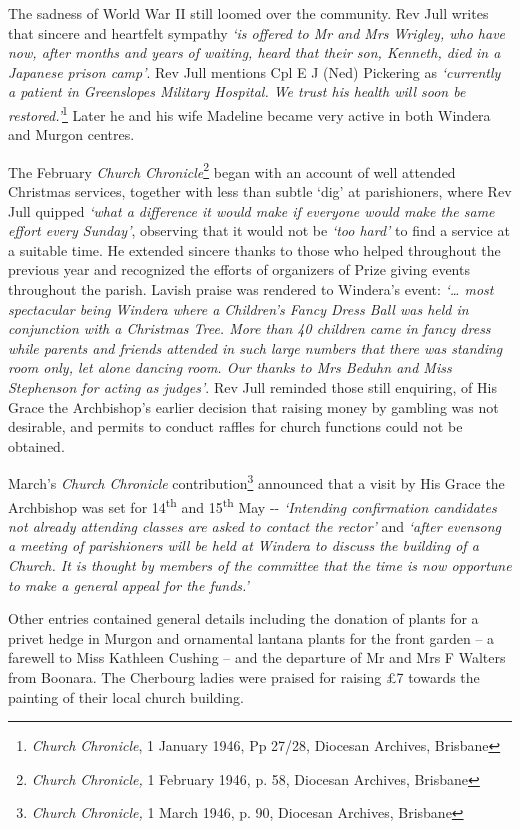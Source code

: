 The sadness of World War II still loomed over the community. Rev Jull writes that sincere and heartfelt sympathy \emph{`is offered to Mr and Mrs Wrigley, who have now, after months and years of waiting, heard that their son, Kenneth, died in a Japanese prison camp'}. Rev Jull mentions Cpl E J (Ned) Pickering as \emph{`currently a patient in Greenslopes Military Hospital. We trust his health will soon be restored.'}\footnote{\emph{Church Chronicle}, 1 January 1946, Pp 27/28, Diocesan Archives, Brisbane} Later he and his wife Madeline became very active in both Windera and Murgon centres.


The February \emph{Church Chronicle}\footnote{\emph{Church Chronicle,} 1 February 1946, p. 58, Diocesan Archives, Brisbane} began with an account of well attended Christmas services, together with less than subtle `dig' at parishioners, where Rev Jull quipped \emph{`what a difference it would make if everyone would make the same effort every Sunday'}, observing that it would not be \emph{`too hard'} to find a service at a suitable time. He extended sincere thanks to those who helped throughout the previous year and recognized the efforts of organizers of Prize giving events throughout the parish. Lavish praise was rendered to Windera's event: \emph{`\ldots{} most spectacular being Windera where a Children's Fancy Dress Ball was held in conjunction with a Christmas Tree. More than 40 children came in fancy dress while parents and friends attended in such large numbers that there was standing room only, let alone dancing room. Our thanks to Mrs Beduhn and Miss Stephenson for acting as judges'}. Rev Jull reminded those still enquiring, of His Grace the Archbishop's earlier decision that raising money by gambling was not desirable, and permits to conduct raffles for church functions could not be obtained.


March's \emph{Church Chronicle} contribution\footnote{\emph{Church Chronicle,} 1 March 1946, p. 90, Diocesan Archives, Brisbane} announced that a visit by His Grace the Archbishop was set for 14\textsuperscript{th} and 15\textsuperscript{th} May -\/- \emph{`Intending confirmation candidates not already attending classes are asked to contact the rector'} and \emph{`after evensong a meeting of parishioners will be held at Windera to discuss the building of a Church. It is thought by members of the committee that the time is now opportune to make a general appeal for the funds.'}


Other entries contained general details including the donation of plants for a privet hedge in Murgon and ornamental lantana plants for the front garden -- a farewell to Miss Kathleen Cushing -- and the departure of Mr and Mrs F Walters from Boonara. The Cherbourg ladies were praised for raising \pounds7 towards the painting of their local church building.



